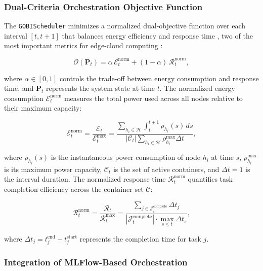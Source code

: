 \subsubsection{Dual-Criteria Orchestration Objective Function}

The \texttt{GOBIScheduler} minimizes a normalized dual-objective function over each interval $[t, t+1]$ that balances energy efficiency and response time \cite{tuli2021cosco}, two of the most important metrics for edge-cloud computing \cite{mcchesney2019defog}:

\begin{equation}
\label{eq:objective_function}
\mathcal{O}(\mathbf{P}_t) = \alpha \, \mathcal{E}_t^{\text{norm}} + (1-\alpha) \, \mathcal{R}_t^{\text{norm}},
\end{equation}

\noindent where $\alpha \in [0,1]$ controls the trade-off between energy consumption and response time, and $\mathbf{P}_t$ represents the system state at time $t$. The normalized energy consumption $\mathcal{E}_t^{\text{norm}}$ measures the total power used across all nodes relative to their maximum capacity:

\begin{equation}
\label{eq:energy_consumption}
\mathcal{E}_t^{\text{norm}} = \frac{\mathcal{E}_t}{\mathcal{E}_t^{\text{max}}} = \frac{\sum_{h_i \in \mathcal{H}} \int_{t}^{t+1} \rho_{h_i}(s) \, ds}{|\mathcal{C}_t| \sum_{h_i \in \mathcal{H}} \rho_{h_i}^{\text{max}} \Delta t},
\end{equation}

\noindent where $\rho_{h_i}(s)$ is the instantaneous power consumption of node $h_i$ at time $s$, $\rho_{h_i}^{\text{max}}$ is its maximum power capacity, $\mathcal{C}_t$ is the set of active containers, and $\Delta t = 1$ is the interval duration. The normalized response time $\mathcal{R}_t^{\text{norm}}$ quantifies task completion efficiency across the container set $\mathcal{C}$:

\begin{equation}
\label{eq:response_time}
\mathcal{R}_t^{\text{norm}} = \frac{\mathcal{R}_t}{\mathcal{R}_t^{\text{max}}} = \frac{\sum_{j \in \mathcal{J}_t^{\text{complete}}} \Delta t_j}
{|\mathcal{J}_t^{\text{complete}}| \cdot \max_{s \leq t} \Delta t_s},
\end{equation}

\noindent where $\Delta t_j = t_j^{\text{end}} - t_j^{\text{start}}$ represents the completion time for task $j$.

\subsubsection{Integration of MLFlow-Based Orchestration}

